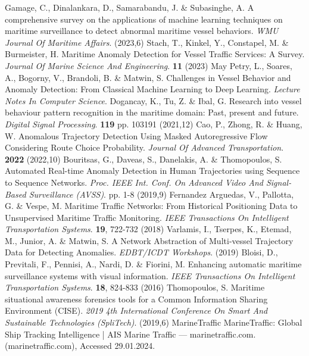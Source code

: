 Gamage, C., Dinalankara, D., Samarabandu, J. \& Subasinghe, A. A comprehensive survey on the applications of machine learning techniques on maritime surveillance to detect abnormal maritime vessel behaviors. {\em WMU Journal Of Maritime Affairs}. (2023,6)
Stach, T., Kinkel, Y., Constapel, M. \& Burmeister, H. Maritime Anomaly Detection for Vessel Traffic Services: A Survey. {\em Journal Of Marine Science And Engineering}. \textbf{11} (2023)
May Petry, L., Soares, A., Bogorny, V., Brandoli, B. \& Matwin, S. Challenges in Vessel Behavior and Anomaly Detection: From Classical Machine Learning to Deep Learning. {\em Lecture Notes In Computer Science}.
Dogancay, K., Tu, Z. \& Ibal, G. Research into vessel behaviour pattern recognition in the maritime domain: Past, present and future. {\em Digital Signal Processing}. \textbf{119} pp. 103191 (2021,12)
Cao, P., Zhong, R. \& Huang, W. Anomalous Trajectory Detection Using Masked Autoregressive Flow Considering Route Choice Probability. {\em Journal Of Advanced Transportation}. \textbf{2022} (2022,10)
Bouritsas, G., Daveas, S., Danelakis, A. \& Thomopoulos, S. Automated Real-time Anomaly Detection in Human Trajectories using Sequence to Sequence Networks. {\em Proc. IEEE Int. Conf. On Advanced Video And Signal-Based Surveillance (AVSS)}. pp. 1-8 (2019,9)
Fernandez Arguedas, V., Pallotta, G. \& Vespe, M. Maritime Traffic Networks: From Historical Positioning Data to Unsupervised Maritime Traffic Monitoring. {\em IEEE Transactions On Intelligent Transportation Systems}. \textbf{19}, 722-732 (2018)
Varlamis, I., Tserpes, K., Etemad, M., Junior, A. \& Matwin, S. A Network Abstraction of Multi-vessel Trajectory Data for Detecting Anomalies. {\em EDBT/ICDT Workshops}. (2019)
Bloisi, D., Previtali, F., Pennisi, A., Nardi, D. \& Fiorini, M. Enhancing automatic maritime surveillance systems with visual information. {\em IEEE Transactions On Intelligent Transportation Systems}. \textbf{18}, 824-833 (2016)
Thomopoulos, S. Maritime situational awareness forensics tools for a Common Information Sharing Environment (CISE). {\em 2019 4th International Conference On Smart And Sustainable Technologies (SpliTech)}. (2019,6)
MarineTraffic MarineTraffic: Global Ship Tracking Intelligence | AIS Marine Traffic — marinetraffic.com. (marinetraffic.com), Accessed 29.01.2024.
